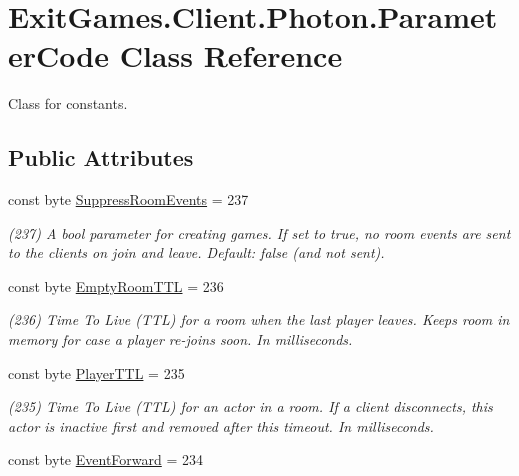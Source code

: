 \hypertarget{class_exit_games_1_1_client_1_1_photon_1_1_parameter_code}{}\section{Exit\+Games.\+Client.\+Photon.\+Parameter\+Code Class Reference}
\label{class_exit_games_1_1_client_1_1_photon_1_1_parameter_code}


Class for constants.  


\subsection*{Public Attributes}
\begin{DoxyCompactItemize}
\item 
const byte \hyperlink{class_exit_games_1_1_client_1_1_photon_1_1_parameter_code_a89faf31fa005273789198373b5e3dabf}{Suppress\+Room\+Events} = 237
\begin{DoxyCompactList}\small\item\em (237) A bool parameter for creating games. If set to true, no room events are sent to the clients on join and leave. Default\+: false (and not sent).\end{DoxyCompactList}\item 
const byte \hyperlink{class_exit_games_1_1_client_1_1_photon_1_1_parameter_code_a0574262c253d27175d80c8ca7771300d}{Empty\+Room\+T\+TL} = 236
\begin{DoxyCompactList}\small\item\em (236) Time To Live (T\+TL) for a room when the last player leaves. Keeps room in memory for case a player re-\/joins soon. In milliseconds.\end{DoxyCompactList}\item 
const byte \hyperlink{class_exit_games_1_1_client_1_1_photon_1_1_parameter_code_a90062be6045e858dfdefc63c6bb26cc9}{Player\+T\+TL} = 235
\begin{DoxyCompactList}\small\item\em (235) Time To Live (T\+TL) for an \textquotesingle{}actor\textquotesingle{} in a room. If a client disconnects, this actor is inactive first and removed after this timeout. In milliseconds.\end{DoxyCompactList}\item 
const byte \hyperlink{class_exit_games_1_1_client_1_1_photon_1_1_parameter_code_a1b563d7ed2a72e96474490ee5b95a613}{Event\+Forward} = 234

\end{DoxyCompactItemize}
